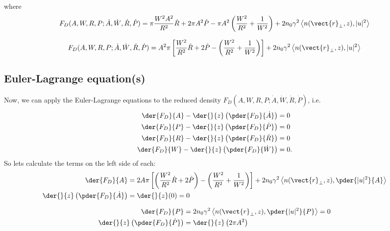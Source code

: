 where
\begin{equation}
    F_{D}(A,W,R,P;\dot{A},\dot{W},\dot{R},\dot{P}) = \pi \frac{W^2 A^2}{R^2} \dot{R} + 2 \pi A^2 \dot{P}   - \pi  A^2  \left(\frac{W^2}{R^2} + \frac{1}{W^2}\right) + 2n_0 \gamma^2 \left<n(\vect{r}_{\perp},z), |u|^2\right>  
\end{equation}
 
\begin{equation}
    F_{D}(A,W,R,P;\dot{A},\dot{W},\dot{R},\dot{P}) = A^2\pi \left[\frac{W^2}{R^2} \dot{R} + 2 \dot{P} - \left(\frac{W^2}{R^2} + \frac{1}{W^2}\right)\right] + 2n_0 \gamma^2 \left<n(\vect{r}_{\perp},z), |u|^2\right>  
\end{equation} 

\subsection{Euler-Lagrange equation(s)}

Now, we can apply the Euler-Lagrange equations to the reduced density $F_{D}(A,W,R,P;\dot{A},\dot{W},\dot{R},\dot{P})$, i.e.
\begin{equation}
\begin{split}
    \der{F_{D}}{A}  - \der{}{z}\left(\pder{F_{D}}{\dot{A}}\right) &= 0 \\
    \der{F_{D}}{P}  - \der{}{z}\left(\pder{F_{D}}{\dot{P}}\right) &= 0 \\
    \der{F_{D}}{R}  - \der{}{z}\left(\pder{F_{D}}{\dot{R}}\right) &= 0 \\
    \der{F_{D}}{W}  - \der{}{z}\left(\pder{F_{D}}{\dot{W}}\right) &= 0. \\
\end{split}
\end{equation}
So lets calculate the terms on the left side of each:
\begin{equation}
\begin{split}
    \der{F_{D}}{A}  &= 2A \pi \left[\left(\frac{W^2}{R^2}\dot{R}  + 2\dot{P}\right) -  \left(\frac{W^2}{R^2} + \frac{1}{W^2}\right) \right] + 2 n_0 \gamma^2 \left< n(\vect{r}_{\perp},z),\pder{|u|^2}{A}\right>\\
\der{}{z}\left(\pder{F_{D}}{\dot{A}}\right) &= \der{}{z}(0) = 0 \\
\end{split}
\end{equation}


\begin{equation}
\begin{split}
   \der{F_{D}}{P}  &= 2n_0 \gamma^2 \left< n(\vect{r}_{\perp},z),\pder{|u|^2}{P}  \right> = 0 \\
\der{}{z}\left(\pder{F_{D}}{\dot{P}}\right) &= \der{}{z}\left( 2 \pi A^2 \right)  \\
\end{split}
\end{equation}


